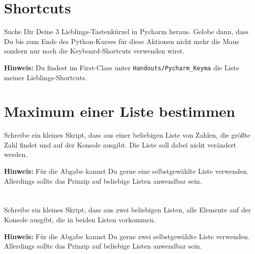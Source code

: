 \documentclass[a4paper]{article}
\begin{document}




\section{Shortcuts}
Suche Dir Deine 3 Lieblings-Tastenkürzel in Pycharm heraus. Gelobe dann, dass Du bis zum Ende des Python-Kurses für diese Aktionen nicht mehr die Maus sondern nur noch die Keyboard-Shortcuts verwenden wirst. 

\vspace{2pt}

{\footnotesize\textbf{Hinweis:}
Du findest im First-Class unter \texttt{Handouts/Pycharm\_Keyma} die Liste meiner Lieblings-Shortcuts.}


\section{Maximum einer Liste bestimmen}
Schreibe ein kleines Skript, dass aus einer beliebigen Liste von Zahlen, die größte Zahl findet und auf der Konsole ausgibt. Die Liste soll dabei nicht verändert werden.  

 \vspace{2pt}
{\footnotesize\textbf{Hinweis:} Für die Abgabe kannst Du gerne eine selbstgewählte Liste verwenden. Allerdings sollte das Prinzip auf beliebige Listen anwendbar sein.}



\section{}
Schreibe ein kleines Skript, dass aus zwei beliebigen Listen, alle Elemente auf der Konsole ausgibt, die in beiden Listen vorkommen. 
\vspace{2pt}

{\footnotesize\textbf{Hinweis:} Für die Abgabe kannst Du gerne zwei selbstgewählte Liste verwenden. Allerdings sollte das Prinzip auf beliebige Listen anwendbar sein.}
 
\end{document}
